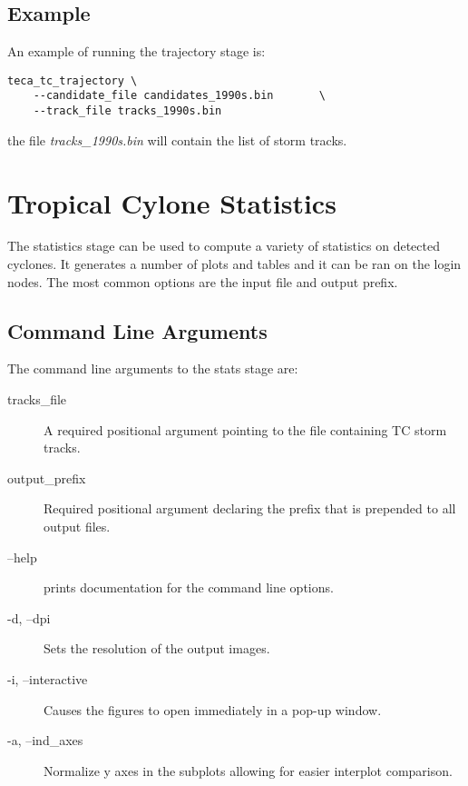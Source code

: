 \documentclass[a4paper,10pt,DIV=12]{scrreprt}
\begin{document}
\subsection{Example}
\noindent An example of running the trajectory stage is:
\begin{verbatim}
teca_tc_trajectory \
    --candidate_file candidates_1990s.bin       \
    --track_file tracks_1990s.bin
\end{verbatim}
the file \textit{tracks\_1990s.bin} will contain the list of storm tracks.

\section{Tropical Cylone Statistics}

The statistics stage can be used to compute a variety of statistics on detected cyclones. It generates a number of plots and tables and it can be ran on the login nodes. The most common options are the input file and output prefix. 

\subsection{Command Line Arguments}
The command line arguments to the stats stage are:
\begin{description}
\item[tracks\_file] A required positional argument pointing to the file containing TC storm tracks.
\item[output\_prefix] Required positional argument declaring the prefix that is prepended to all output files.
\item[--help] prints documentation for the command line options.
\item[-d, --dpi] Sets the resolution of the output images.
\item[-i, --interactive] Causes the figures to open immediately in a pop-up window.
\item[-a, --ind\_axes] Normalize y axes in the subplots allowing for easier interplot comparison.
\end{description}
\end{document}

